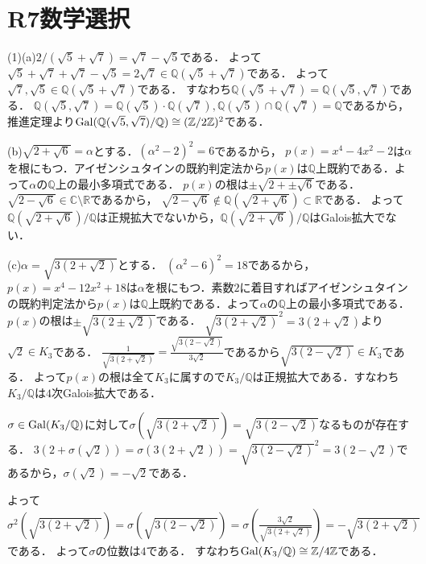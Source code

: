 \documentclass[
		book,
		head_space=20mm,
		foot_space=20mm,
		gutter=10mm,
		line_length=190mm
]{jlreq}
\begin{document}
\section{R7数学選択}
(1)(a)$2/(\sqrt{5}+\sqrt{7})=\sqrt{7}-\sqrt{5}$である．
よって$\sqrt{5}+\sqrt{7}+\sqrt{7}-\sqrt{5}=2\sqrt{7}\in \mathbb{Q}(\sqrt{5}+\sqrt{7})$である．
よって$\sqrt{7},\sqrt{5}\in \mathbb{Q}(\sqrt{5}+\sqrt{7})$である．
すなわち$\mathbb{Q}(\sqrt{5}+\sqrt{7})=\mathbb{Q}(\sqrt{5},\sqrt{7})$である．
$\mathbb{Q}(\sqrt{5},\sqrt{7})=\mathbb{Q}(\sqrt{5})\cdot\mathbb{Q}(\sqrt{7}),\mathbb{Q}(\sqrt{5})\cap\mathbb{Q}(\sqrt{7})=\mathbb{Q}$であるから，
推進定理より$\mathop{\mathrm{Gal}}(\mathbb{Q}(\sqrt{5},\sqrt{7})/\mathbb{Q})\cong (\mathbb{Z}/2\mathbb{Z})^2$である．

(b)$\sqrt{2+\sqrt{6}}=\alpha$とする．$(\alpha^2-2)^2=6$であるから，
$p(x)=x^4-4x^2-2$は$\alpha$を根にもつ．アイゼンシュタインの既約判定法から$p(x)$は$\mathbb{Q}$上既約である．よって$\alpha$の$\mathbb{Q}$上の最小多項式である．
$p(x)$の根は$\pm \sqrt{2+\pm \sqrt{6}}$である．$\sqrt{2-\sqrt{6}}\in \mathbb{C}\setminus \mathbb{R}$であるから，
$\sqrt{2-\sqrt{6}}\notin \mathbb{Q}(\sqrt{2+\sqrt{6}})\subset \mathbb{R}$である．
よって$\mathbb{Q}(\sqrt{2+\sqrt{6}})/\mathbb{Q}$は正規拡大でないから，$\mathbb{Q}(\sqrt{2+\sqrt{6}})/\mathbb{Q}$はGalois拡大でない．

(c)$\alpha=\sqrt{3(2+\sqrt{2})}$とする．
$(\alpha^2-6)^2=18$であるから，
$p(x)=x^4-12x^2+18$は$\alpha$を根にもつ．素数$2$に着目すればアイゼンシュタインの既約判定法から$p(x)$は$\mathbb{Q}$上既約である．よって$\alpha$の$\mathbb{Q}$上の最小多項式である．
$p(x)$の根は$\pm \sqrt{3(2\pm \sqrt{2})}$である．
$\sqrt{3(2+\sqrt{2})}^2=3(2+\sqrt{2})$より$\sqrt{2}\in K_3$である．
$\frac{1}{\sqrt{3(2+\sqrt{2})}}=\frac{\sqrt{3(2-\sqrt{2})}}{3\sqrt{2}}$であるから$\sqrt{3(2-\sqrt{2})}\in K_3$である．
よって$p(x)$の根は全て$K_3$に属すので$K_3/\mathbb{Q}$は正規拡大である．すなわち$K_3/\mathbb{Q}$は$4$次Galois拡大である．

$\sigma\in \mathop{\mathrm{Gal}}(K_3/\mathbb{Q})$に対して$\sigma(\sqrt{3(2+\sqrt{2})})=\sqrt{3(2-\sqrt{2})}$なるものが存在する．
$3(2+\sigma(\sqrt{2}))=\sigma(3(2+\sqrt{2}))=\sqrt{3(2-\sqrt{2})}^2=3(2-\sqrt{2})$であるから，$\sigma(\sqrt{2})=-\sqrt{2}$である．

よって$\sigma^2(\sqrt{3(2+\sqrt{2})})=\sigma(\sqrt{3(2-\sqrt{2})})=\sigma(\frac{3\sqrt{2}}{\sqrt{3(2+\sqrt{2})}})=-\sqrt{3(2+\sqrt{2})}$である．
よって$\sigma$の位数は$4$である．
すなわち$\mathop{\mathrm{Gal}}(K_3/\mathbb{Q})\cong \mathbb{Z}/4\mathbb{Z}$である．
\end{document}
